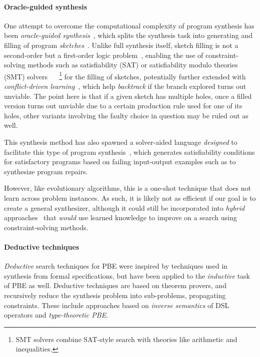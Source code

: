 \documentclass{article}
\begin{document}
\paragraph{Oracle-guided synthesis}

One attempt to overcome the computational complexity of program synthesis
has been \emph{oracle-guided synthesis}~\citep{solar2008program},
which splits the synthesis task into generating and filling of program
\emph{sketches}~\citep{murali2017neural}.
Unlike full synthesis itself, sketch filling is not a second-order but a
first-order logic problem~\citep{gulwani2017program}, enabling the use of constraint-solving methods
such as satisfiability (SAT) or satisfiability modulo theories (SMT) solvers%
~\citep{akiba2013calibrating,alur2013syntax,alur2016sygus,rosette,architecture}%
~\footnote{
    SMT solvers combine SAT-style search with theories like arithmetic and inequalities.
} for the filling of sketches, potentially further extended with
\emph{conflict-driven learning}~\citep{feng2018program,hornclauses},
which help \emph{backtrack} if the branch explored turns out unviable.
The point here is that if a given sketch has multiple holes,
once a filled version turns out unviable due to a certain production rule used for one of its holes,
other variants involving the faulty choice in question may be ruled out as well.

This synthesis method has also spawned a solver-aided language
\emph{designed} to facilitate this type of program synthesis~\citep{rosette},
which generates satisfiability conditions for satisfactory programs
based on failing input-output examples such as to synthesize program repairs.

However, like evolutionary algorithms, this is a one-shot technique
that does not learn across problem instances.
As such, it is likely not as efficient if our goal is to create a general synthesizer,
although it could still be incorporated into \emph{hybrid} approaches~\citep{deepcoder} that \emph{would} use learned knowledge to improve on a search using constraint-solving methods.

\paragraph{Deductive techniques}

\emph{Deductive} search techniques for PBE were inspired by
techniques used in synthesis from formal specifications,
but have been applied to the \emph{inductive} task of PBE as well.
Deductive techniques are based on theorem provers,
and recursively reduce the synthesis problem into sub-problems,
propagating constraints.
These include approaches based on \emph{inverse semantics} of
DSL operators and \emph{type-theoretic PBE}.
\end{document}
